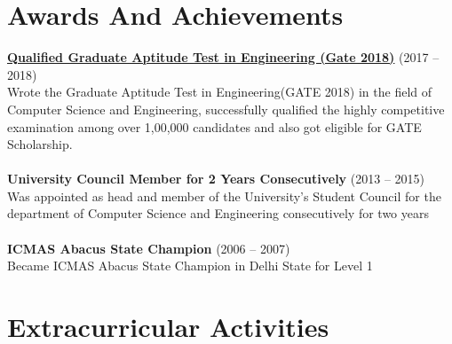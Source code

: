 \documentclass[margin,line]{res}
\begin{document}
\begin{resume}
\section{\sc Awards And Achievements}
{\bf \href{https://en.wikipedia.org/wiki/Graduate_Aptitude_Test_in_Engineering} {Qualified Graduate Aptitude Test in Engineering  (Gate 2018)}} \hfill (2017 -- 2018) \\
Wrote the Graduate Aptitude Test in Engineering(GATE 2018) in the field of Computer Science and Engineering, successfully qualified the highly competitive examination among over 1,00,000  candidates and also got eligible for GATE Scholarship. \\\\
{\bf University Council Member for 2 Years Consecutively} \hfill  (2013 -- 2015)\\
Was appointed as head and member of  the University's Student Council  for the department of Computer Science and Engineering consecutively for two years \\\\
{\bf ICMAS Abacus State Champion} \hfill (2006 --  2007)\\
Became ICMAS Abacus State Champion in Delhi State for Level 1\\


\section{\sc Extracurricular Activities}


\end{resume}
\end{document}
